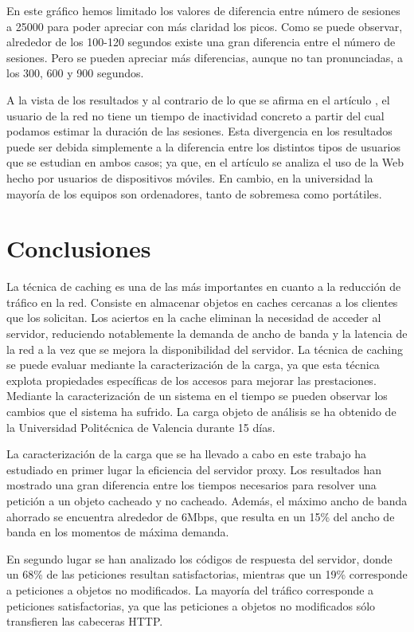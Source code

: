 \documentclass[twocolumn]{Jornadas}
\begin{document}
En este gráfico hemos limitado los valores de diferencia entre número de sesiones a 25000 para poder apreciar con más claridad los picos. Como se puede observar, alrededor de los 100-120 segundos existe una gran diferencia entre el número de sesiones. Pero se pueden apreciar más diferencias, aunque no tan pronunciadas, a los 300, 600 y 900 segundos.

A la vista de los resultados y al contrario de lo que se afirma en el artículo \cite{adya2001analyzing}, el usuario de la red no tiene un tiempo de inactividad concreto a partir del cual podamos estimar la duración de las sesiones. Esta divergencia en los resultados puede ser debida simplemente a la diferencia entre los distintos tipos de usuarios que se estudian en ambos casos; ya que, en el artículo \cite{adya2001analyzing} se analiza el uso de la Web hecho por usuarios de dispositivos móviles. En cambio, en la universidad la mayoría de los equipos son ordenadores, tanto de sobremesa como portátiles.

\section{Conclusiones}
\label{conclusiones}

La técnica de caching es una de las más importantes en cuanto a la reducción de tráfico en la red. Consiste en almacenar objetos en caches cercanas a los clientes que los solicitan. Los aciertos en la cache eliminan la necesidad de acceder al servidor, reduciendo notablemente la demanda de ancho de banda y la latencia de la red a la vez que se mejora la disponibilidad del servidor. La técnica de caching se puede evaluar mediante la caracterización de la carga, ya que esta técnica explota propiedades específicas de los accesos para mejorar las prestaciones.
Mediante la caracterización de un sistema en el tiempo se pueden observar los cambios que el sistema ha sufrido. La carga objeto de análisis se ha obtenido de la Universidad Politécnica de Valencia durante 15 días.

La caracterización de la carga que se ha llevado a cabo en este trabajo ha estudiado en primer lugar la eficiencia del servidor proxy.
Los resultados han mostrado una gran diferencia entre los tiempos necesarios para resolver una petición a un objeto cacheado y no cacheado. Además, el máximo ancho de banda ahorrado se encuentra alrededor de 6Mbps, que resulta en un 15\% del ancho de banda en los momentos de máxima demanda. 

En segundo lugar se han analizado los códigos de respuesta del servidor, donde un 68\% de las peticiones resultan satisfactorias, mientras que un 19\% corresponde a peticiones a objetos no modificados. La mayoría del tráfico corresponde a peticiones satisfactorias, ya que las peticiones a objetos no modificados sólo transfieren las cabeceras HTTP.
\end{document}
